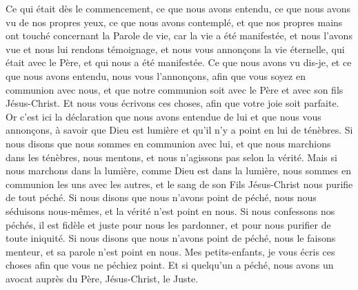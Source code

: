 \begin{multicols}{2}
\VerseOne{}Ce qui était dès le commencement, ce que nous avons entendu, ce que nous avons vu de nos propres yeux, ce que nous avons contemplé, et que nos propres mains ont touché concernant la Parole de vie,
car la vie a été manifestée, et nous l'avons vue et nous lui rendons témoignage, et nous vous annonçons la vie éternelle, qui était avec le Père, et qui nous a été manifestée.
Ce que nous avons vu dis-je, et ce que nous avons entendu, nous vous l'annonçons, afin que vous soyez en communion avec nous, et que notre communion soit avec le Père et avec son fils Jésus-Christ.
Et nous vous écrivons ces choses, afin que votre joie soit parfaite.
Or c'est ici la déclaration que nous avons entendue de lui et que nous vous annonçons, à savoir que Dieu est lumière et qu'il n'y a point en lui de ténèbres.
Si nous disons que nous sommes en communion avec lui, et que nous marchions dans les ténèbres, nous mentons, et nous n'agissons pas selon la vérité.
Mais si nous marchons dans la lumière, comme Dieu est dans la lumière, nous sommes en communion les uns avec les autres, et le sang de son Fils Jésus-Christ nous purifie de tout péché.
Si nous disons que nous n'avons point de péché, nous nous séduisons nous-mêmes, et la vérité n'est point en nous.
Si nous confessons nos péchés, il est fidèle et juste pour nous les pardonner, et pour nous purifier de toute iniquité.
Si nous disons que nous n'avons point de péché, nous le faisons menteur, et sa parole n'est point en nous.
\VerseOne{}Mes petits-enfants, je vous écris ces choses afin que vous ne péchiez point. Et si quelqu'un a péché, nous avons un avocat{} auprès du Père, Jésus-Christ, le Juste.

\end{multicols}
